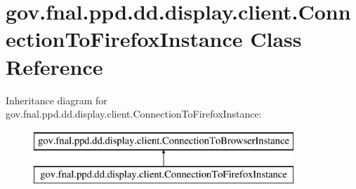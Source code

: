 \hypertarget{classgov_1_1fnal_1_1ppd_1_1dd_1_1display_1_1client_1_1ConnectionToFirefoxInstance}{\section{gov.\-fnal.\-ppd.\-dd.\-display.\-client.\-Connection\-To\-Firefox\-Instance Class Reference}
\label{classgov_1_1fnal_1_1ppd_1_1dd_1_1display_1_1client_1_1ConnectionToFirefoxInstance}
}
Inheritance diagram for gov.\-fnal.\-ppd.\-dd.\-display.\-client.\-Connection\-To\-Firefox\-Instance\-:\begin{figure}[H]
\begin{center}
\leavevmode
\includegraphics[height=2.000000cm]{classgov_1_1fnal_1_1ppd_1_1dd_1_1display_1_1client_1_1ConnectionToFirefoxInstance}
\end{center}
\end{figure}
